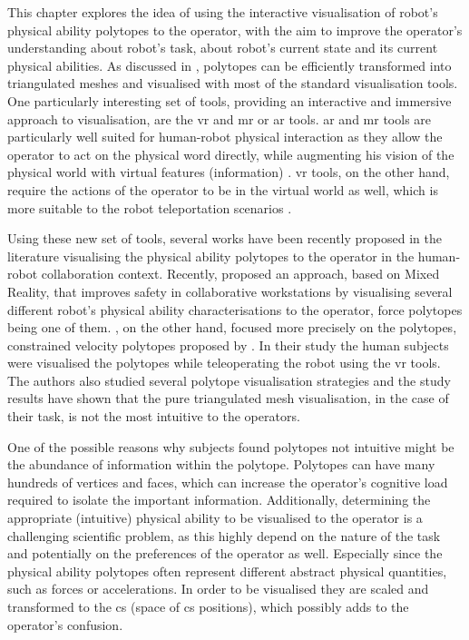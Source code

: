 This chapter explores the idea of using the interactive visualisation of robot's physical ability polytopes to the operator, with the aim to improve the operator's understanding about robot's task, about robot's current state and its current physical abilities.
As discussed in , polytopes can be efficiently transformed into triangulated meshes and visualised with most of the standard visualisation tools. One particularly interesting set of tools, providing an interactive and immersive approach to visualisation, are the \gls{vr} and \gls{mr} or \gls{ar} tools. \gls{ar} and \gls{mr} tools are particularly well suited for human-robot physical interaction as they allow the operator to act on the physical word directly, while augmenting his vision of the physical world with virtual features (information) \cite{Suzuki2022ARSurvey}. \gls{vr} tools, on the other hand, require the actions of the operator to be in the virtual world as well, which is more suitable to the robot teleportation scenarios \cite{Merwe2019VRTeleop}. 

Using these new set of tools, several works have been recently proposed in the literature visualising the physical ability polytopes to the operator in the human-robot collaboration context. Recently, \citet{Weistroffer2022Using} proposed an approach, based on Mixed Reality, that improves safety in collaborative workstations by visualising several different robot's physical ability characterisations to the operator, force polytopes being one of them. \citet{Zolotas2021}, on the other hand, focused more precisely on the polytopes, constrained velocity polytopes proposed by \citet{long_constrained_2020}. In their study the human subjects were visualised the polytopes while teleoperating the robot using the \gls{vr} tools. The authors also studied several polytope visualisation strategies and the study results have shown that the pure triangulated mesh visualisation, in the case of their task, is not the most intuitive to the operators.

One of the possible reasons why subjects found polytopes not intuitive might be the abundance of information within the polytope. Polytopes can have many hundreds of vertices and faces, which can increase the operator's cognitive load required to isolate the important information. 
Additionally, determining the appropriate (intuitive) physical ability to be visualised to the operator is a challenging scientific problem, as this highly depend on the nature of the task and potentially on the preferences of the operator as well. Especially since the physical ability polytopes often represent different abstract physical quantities, such as forces or accelerations. In order to be visualised they are scaled and transformed to the \gls{cs} (space of \gls{cs} positions), which possibly adds to the operator's confusion. 

